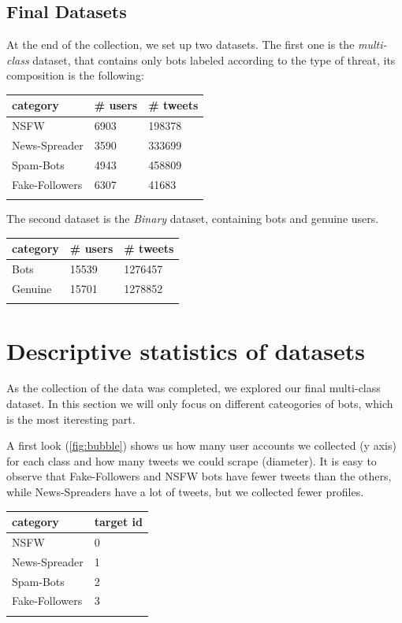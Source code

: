 \subsection{Final Datasets}
At the end of the collection, we set up two datasets. The first one is the \textit{multi-class} dataset, that contains only bots labeled according to the type of threat, its composition is the following:

\begin{center}
\begin{tabular}{lll}
	\\category&\# users&\# tweets\\
	\hline\hline
	NSFW&6903&198378\\
	News-Spreader&3590&333699\\
	Spam-Bots&4943&458809\\
	Fake-Followers&6307&41683\\\hline\\	
\end{tabular}
\end{center}

The second dataset is the \textit{Binary} dataset, containing bots and genuine users.

\begin{center}
	\begin{tabular}{lll}
		\\category&\# users&\# tweets\\
		\hline\hline
		Bots&15539&1276457\\
		Genuine&15701&1278852\\\hline\\	
	\end{tabular}
\end{center}

\newpage
\section{Descriptive statistics of datasets}
As the collection of the data was completed, we explored our final multi-class dataset. In this section we will only focus on different cateogories of bots, which is the most iteresting part.

A first look (\ref{fig:bubble}) shows us how many user accounts we collected (y axis) for each class and how many tweets we could scrape (diameter). It is easy to observe that Fake-Followers and NSFW bots have fewer tweets than the others, while News-Spreaders have a lot of tweets, but we collected fewer profiles.
\begin{center}
	\begin{tabular}{ll}
		\\category&target id\\
		\hline\hline
		NSFW&0\\
		News-Spreader&1\\
		Spam-Bots&2\\
		Fake-Followers&3\\\hline\\		
	\end{tabular}
\end{center}


